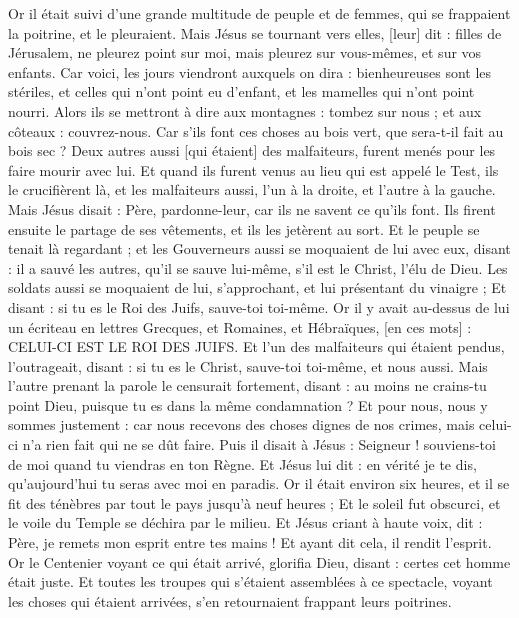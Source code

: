 \begin{multicols}{2}
Or il était suivi d'une grande multitude de peuple et de femmes, qui se frappaient la poitrine, et le pleuraient.
Mais Jésus se tournant vers elles, [leur] dit : filles de Jérusalem, ne pleurez point sur moi, mais pleurez sur vous-mêmes, et sur vos enfants.
Car voici, les jours viendront auxquels on dira : bienheureuses sont les stériles, et celles qui n'ont point eu d'enfant, et les mamelles qui n'ont point nourri.
Alors ils se mettront à dire aux montagnes : tombez sur nous ; et aux côteaux : couvrez-nous.
Car s'ils font ces choses au bois vert, que sera-t-il fait au bois sec ?
Deux autres aussi [qui étaient] des malfaiteurs, furent menés pour les faire mourir avec lui.
Et quand ils furent venus au lieu qui est appelé le Test, ils le crucifièrent là, et les malfaiteurs aussi, l'un à la droite, et l'autre à la gauche.
Mais Jésus disait : Père, pardonne-leur, car ils ne savent ce qu'ils font. Ils firent ensuite le partage de ses vêtements, et ils les jetèrent au sort.
Et le peuple se tenait là regardant ; et les Gouverneurs aussi se moquaient de lui avec eux, disant : il a sauvé les autres, qu'il se sauve lui-même, s'il est le Christ, l'élu de Dieu.
Les soldats aussi se moquaient de lui, s'approchant, et lui présentant du vinaigre ;
Et disant : si tu es le Roi des Juifs, sauve-toi toi-même.
Or il y avait au-dessus de lui un écriteau en lettres Grecques, et Romaines, et Hébraïques, [en ces mots] : CELUI-CI EST LE ROI DES JUIFS.
Et l'un des malfaiteurs qui étaient pendus, l'outrageait, disant : si tu es le Christ, sauve-toi toi-même, et nous aussi.
Mais l'autre prenant la parole le censurait fortement, disant : au moins ne crains-tu point Dieu, puisque tu es dans la même condamnation ?
Et pour nous, nous y sommes justement : car nous recevons des choses dignes de nos crimes, mais celui-ci n'a rien fait qui ne se dût faire.
Puis il disait à Jésus : Seigneur ! souviens-toi de moi quand tu viendras en ton Règne.
Et Jésus lui dit : en vérité je te dis, qu'aujourd'hui tu seras avec moi en paradis.
Or il était environ six heures, et il se fit des ténèbres par tout le pays jusqu'à neuf heures ;
Et le soleil fut obscurci, et le voile du Temple se déchira par le milieu.
Et Jésus criant à haute voix, dit : Père, je remets mon esprit entre tes mains ! Et ayant dit cela, il rendit l'esprit.
Or le Centenier voyant ce qui était arrivé, glorifia Dieu, disant : certes cet homme était juste.
Et toutes les troupes qui s'étaient assemblées à ce spectacle, voyant les choses qui étaient arrivées, s'en retournaient frappant leurs poitrines.

\end{multicols}
